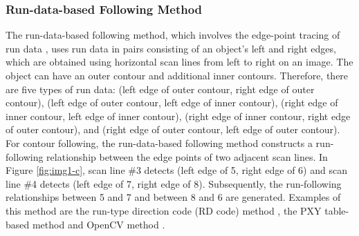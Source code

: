 \subsubsection{Run-data-based Following Method}

The run-data-based following method, which involves the edge-point tracing of run data \cite{Miyatake1997Contour,Shoji1999Contour}, uses run data in pairs consisting of an object's left and right edges, which are obtained using horizontal scan lines from left to right on an image. The object can have an outer contour and additional inner contours. Therefore, there are five types of run data: (left edge of outer contour, right edge of outer contour), (left edge of outer contour, left edge of inner contour), (right edge of inner contour, left edge of inner contour), (right edge of inner contour, right edge of outer contour), and (right edge of outer contour, left edge of outer contour). For contour following, the run-data-based following method constructs a run-following relationship between the edge points of two adjacent scan lines. In Figure \ref{fig:img1-c}, scan line \#3 detects (left edge of 5, right edge of 6) and scan line \#4 detects (left edge of 7, right edge of 8). Subsequently, the run-following relationships between 5 and 7 and between 8 and 6 are generated.  Examples of this method are the run-type direction code (RD code) method \cite{Miyatake1997Contour}, the PXY table-based method \cite{Shoji1999Contour} and OpenCV method \cite{Suzuki1985Topological}. 

